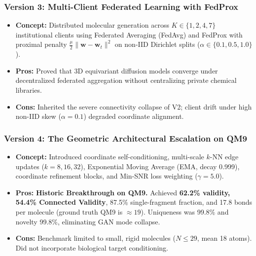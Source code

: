 \documentclass[11pt, a4paper]{article}
\begin{document}
\subsubsection{Version 3: Multi-Client Federated Learning with FedProx}
\begin{itemize}[noitemsep]
    \item \textbf{Concept:} Distributed molecular generation across $K \in \{1, 2, 4, 7\}$ institutional clients using Federated Averaging (FedAvg) and FedProx with proximal penalty $\frac{\mu}{2}\|\bm{w} - \bm{w}_t\|^2$ on non-IID Dirichlet splits ($\alpha \in \{0.1, 0.5, 1.0\}$).
    \item \textbf{Pros:} Proved that 3D equivariant diffusion models converge under decentralized federated aggregation without centralizing private chemical libraries.
    \item \textbf{Cons:} Inherited the severe connectivity collapse of V2; client drift under high non-IID skew ($\alpha = 0.1$) degraded coordinate alignment.
\end{itemize}

\subsubsection{Version 4: The Geometric Architectural Escalation on QM9}
\begin{itemize}[noitemsep]
    \item \textbf{Concept:} Introduced coordinate self-conditioning, multi-scale $k$-NN edge updates ($k=8, 16, 32$), Exponential Moving Average (EMA, decay 0.999), coordinate refinement blocks, and Min-SNR loss weighting ($\gamma = 5.0$).
    \item \textbf{Pros:} \textbf{Historic Breakthrough on QM9.} Achieved \textbf{62.2\% validity, 54.4\% Connected Validity}, 87.5\% single-fragment fraction, and 17.8 bonds per molecule (ground truth QM9 is $\approx 19$). Uniqueness was 99.8\% and novelty 99.8\%, eliminating GAN mode collapse.
    \item \textbf{Cons:} Benchmark limited to small, rigid molecules ($N \le 29$, mean 18 atoms). Did not incorporate biological target conditioning.
\end{itemize}
\end{document}
